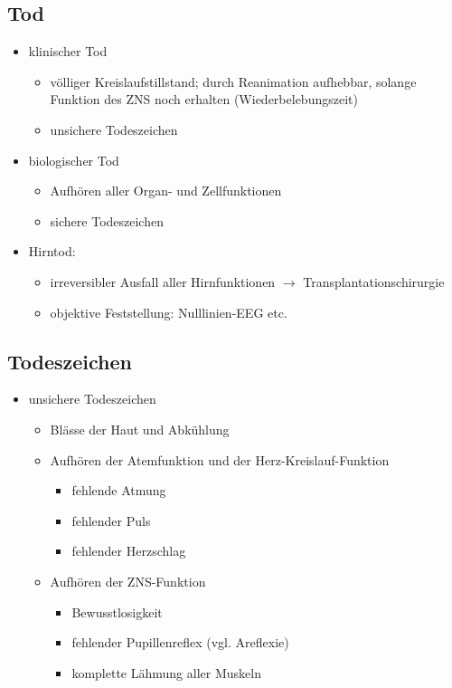 \subsection{Tod}
	\begin{itemize}
		\item klinischer Tod
			\begin{itemize}
				\item völliger Kreislaufstillstand; durch Reanimation aufhebbar, solange Funktion des ZNS noch erhalten (Wiederbelebungszeit)
				\item unsichere Todeszeichen
			\end{itemize}
		\item biologischer Tod
			\begin{itemize}
				\item Aufhören aller Organ- und Zellfunktionen
				\item sichere Todeszeichen
			\end{itemize}
		\item Hirntod:
			\begin{itemize}
				\item irreversibler Ausfall aller Hirnfunktionen  $\rightarrow$  Transplantationschirurgie
				\item objektive Feststellung: Nulllinien-EEG etc.
			\end{itemize}
	\end{itemize}

\subsection{Todeszeichen}
	\begin{itemize}
		\item unsichere Todeszeichen
			\begin{itemize}
				\item Blässe der Haut und Abkühlung
				\item Aufhören der Atemfunktion und der Herz-Kreislauf-Funktion
					\begin{itemize}
						\item fehlende Atmung
						\item fehlender Puls
						\item fehlender Herzschlag
					\end{itemize}
				\item Aufhören der ZNS-Funktion
					\begin{itemize}
						\item Bewusstlosigkeit
						\item fehlender Pupillenreflex (vgl. Areflexie)
						\item komplette Lähmung aller Muskeln
					\end{itemize}
			\end{itemize}
	\end{itemize}

